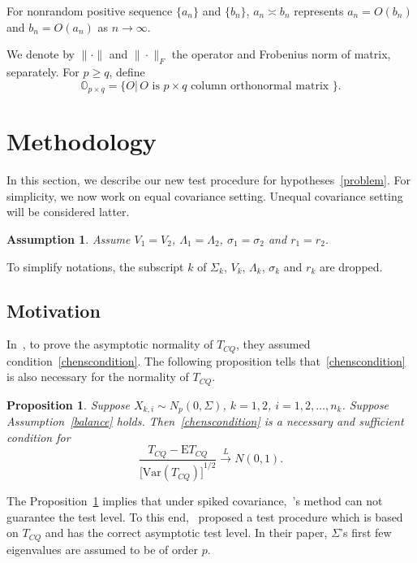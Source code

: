 \documentclass[review]{elsarticle}
\theoremstyle{plain}
\newtheorem{proposition}{\quad\quad Proposition}
\newtheorem{assumption}{\quad\quad Assumption}
\theoremstyle{definition}
\theoremstyle{remark}
\begin{document}
For nonrandom positive sequence $\{a_n\}$ and $\{b_n\}$, $a_n\asymp b_n$ represents $a_n=O(b_n)$ and $b_n=O(a_n)$ as $n\to \infty$.

We denote by $\|\cdot \|$ and $\|\cdot\|_F$ the operator and Frobenius  norm of matrix, separately.
For $p\geq q$, define
\begin{equation*}
\mathbb{O}_{p\times q}=\{O|\, \textrm{$O$ is $p\times q$ column orthonormal matrix }\}.
\end{equation*}

\section{Methodology}

In this section, we describe our new test procedure for hypotheses~\eqref{problem}. For simplicity, we now work on equal covariance setting. Unequal covariance setting will be considered latter.
\begin{assumption}\label{theModel2}
Assume $V_1=V_2$, $\Lambda_1=\Lambda_2$, $\sigma_1=\sigma_2$ and $r_1=r_2$.
\end{assumption}

To simplify notations, the subscript $k$ of $\Sigma_k$, $V_k$, $\Lambda_k$, $\sigma_k$ and $r_k$ are dropped.

\subsection{Motivation}

    In~\cite{Chen2010A}, to prove the asymptotic normality of $T_{CQ}$, they assumed condition~\eqref{chenscondition}.
    The following proposition tells that~\eqref{chenscondition} is also necessary for the normality of $T_{CQ}$.
\begin{proposition}\label{newIf}
    Suppose $X_{k,i}\sim N_p(0,\Sigma)$, $k=1,2$, $i=1,2,\ldots,n_k$. Suppose Assumption~\ref{balance} holds.
    Then~\eqref{chenscondition} is a necessary and sufficient condition for 
    \begin{equation}
        \frac{T_{CQ}-\mathrm{E}T_{CQ}}{{\big[\mathrm{Var}(T_{CQ})\big]}^{1/2}}\xrightarrow{L}N(0,1).
    \end{equation}
\end{proposition}
The Proposition~\ref{newIf} implies that under spiked covariance,~\cite{Chen2010A}'s method can not guarantee the test level.
To this end,~\cite{Ma2015A} proposed a test procedure which is based on $T_{CQ}$ and has the correct asymptotic test level.
In their paper, $\Sigma$'s first few eigenvalues are assumed to be of order $p$.
\end{document}
